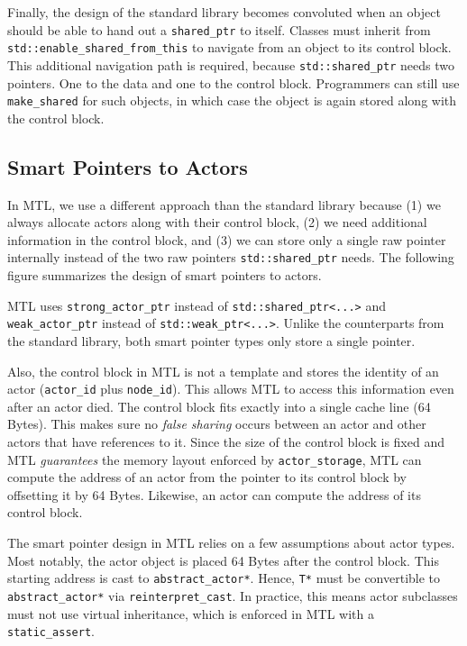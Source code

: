 
Finally, the design of the standard library becomes convoluted when an object
should be able to hand out a \lstinline^shared_ptr^ to itself. Classes must
inherit from \lstinline^std::enable_shared_from_this^ to navigate from an
object to its control block. This additional navigation path is required,
because \lstinline^std::shared_ptr^ needs two pointers. One to the data and one
to the control block. Programmers can still use \lstinline^make_shared^ for
such objects, in which case the object is again stored along with the control
block.

\subsection{Smart Pointers to Actors}

In MTL, we use a different approach than the standard library because (1) we
always allocate actors along with their control block, (2) we need additional
information in the control block, and (3) we can store only a single raw
pointer internally instead of the two raw pointers \lstinline^std::shared_ptr^
needs. The following figure summarizes the design of smart pointers to actors.


MTL uses \lstinline^strong_actor_ptr^ instead of
\lstinline^std::shared_ptr<...>^ and \lstinline^weak_actor_ptr^ instead of
\lstinline^std::weak_ptr<...>^. Unlike the counterparts from the standard
library, both smart pointer types only store a single pointer.

Also, the control block in MTL is not a template and stores the identity of an
actor (\lstinline^actor_id^ plus \lstinline^node_id^). This allows MTL to
access this information even after an actor died. The control block fits
exactly into a single cache line (64 Bytes). This makes sure no \emph{false
sharing} occurs between an actor and other actors that have references to it.
Since the size of the control block is fixed and MTL \emph{guarantees} the
memory layout enforced by \lstinline^actor_storage^, MTL can compute the
address of an actor from the pointer to its control block by offsetting it by
64 Bytes. Likewise, an actor can compute the address of its control block.

The smart pointer design in MTL relies on a few assumptions about actor types.
Most notably, the actor object is placed 64 Bytes after the control block. This
starting address is cast to \lstinline^abstract_actor*^. Hence, \lstinline^T*^
must be convertible to \lstinline^abstract_actor*^ via
\lstinline^reinterpret_cast^. In practice, this means actor subclasses must not
use virtual inheritance, which is enforced in MTL with a
\lstinline^static_assert^.

